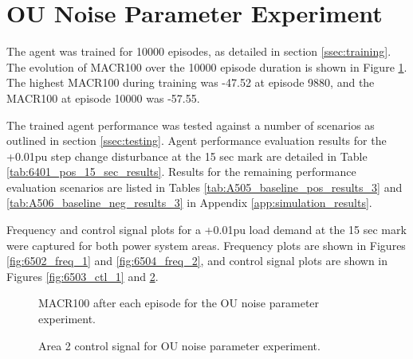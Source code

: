 \section{OU Noise Parameter Experiment}
The agent was trained for 10000 episodes, as detailed in section \ref{ssec:training}. The evolution of MACR100 over the 10000 episode duration is shown in Figure \ref{fig:6501_average_reward}. The highest MACR100 during training was -47.52 at episode 9880, and the MACR100 at episode 10000 was -57.55.

The trained agent performance was tested against a number of scenarios as outlined in section \ref{ssec:testing}. Agent performance evaluation results for the +0.01pu step change disturbance at the 15 sec mark are detailed in Table \ref{tab:6401_pos_15_sec_results}. Results for the remaining performance evaluation scenarios are listed in Tables \ref{tab:A505_baseline_pos_results_3} and \ref{tab:A506_baseline_neg_results_3} in Appendix \ref{app:simulation_results}.

Frequency and control signal plots for a +0.01pu load demand at the 15 sec mark were captured for both power system areas. Frequency plots are shown in Figures \ref{fig:6502_freq_1} and \ref{fig:6504_freq_2}, and control signal plots are shown in Figures \ref{fig:6503_ctl_1} and \ref{fig:6505_ctl_2}.

\begin{figure}[h]
	\centering
	
	\caption{MACR100 after each episode for the OU noise parameter experiment.}\label{fig:6501_average_reward}
\end{figure}



\begin{figure}[h]
	\centering
	
	
	\vspace{-0.5cm}
	\caption{Area 1 frequency response for OU noise parameter experiment.}\label{fig:6502_freq_1}
	
	\vspace{0.5cm}
	
	
	\vspace{-0.5cm}
	\caption{Area 1 control signal for OU noise parameter experiment.}\label{fig:6503_ctl_1}
	
	\vspace{0.5cm}
	
	
	\vspace{-0.5cm}
	\caption{Area 2 frequency response for OU noise parameter experiment.}\label{fig:6504_freq_2}
	
	\vspace{0.5cm}
				
	
	\vspace{-0.5cm}
	\caption{Area 2 control signal for OU noise parameter experiment.}\label{fig:6505_ctl_2}
\end{figure}
